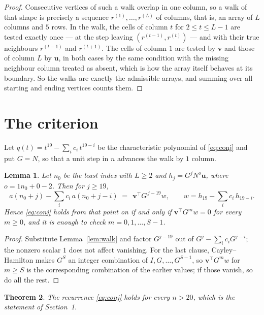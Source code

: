\documentclass[11pt,a4paper]{article}
\theoremstyle{plain}
\newtheorem{theorem}{Theorem}
\newtheorem{lemma}[theorem]{Lemma}
\theoremstyle{definition}
\begin{document}
\begin{proof}
Consecutive vertices of such a walk overlap in one column, so a walk of that shape is
precisely a sequence $r^{(1)},\dots,r^{(L)}$ of columns, that is, an array of $L$ columns
and $5$ rows. In the walk, the cells of column $t$ for $2\le t\le L-1$ are tested
exactly once --- at the step leaving $(r^{(t-1)},r^{(t)})$ --- and with their true
neighbours $r^{(t-1)}$ and $r^{(t+1)}$. The cells of column $1$ are tested by
$\mathbf{v}$ and those of column $L$ by $\mathbf{u}$, in both cases by the same condition
with the missing neighbour column treated as absent, which is how the array itself behaves at
its boundary. So the walks are exactly the admissible arrays, and summing over all starting
and ending vertices counts them.
\end{proof}

\section{The criterion}

Let $q(t)=t^{19}-\sum_i c_i\,t^{19-i}$ be the characteristic polynomial of
\eqref{eq:conj} and put $G=N$, so that a unit step in $n$ advances the walk by
$1$ column.

\begin{lemma}\label{lem:crit}
Let $n_0$ be the least index with $L\ge2$ and $h_j=G^{j}N^{o}\mathbf{u}$, where
$o=1n_0+0-2$. Then for $j\ge19$,
\[
a(n_0+j)-\sum_i c_i\,a(n_0+j-i)\;=\;\,\mathbf{v}^{\!\top}G^{\,j-19}w,
\qquad w=h_{19}-\sum_i c_i\,h_{19-i} .
\]
Hence \eqref{eq:conj} holds from that point on if and only if
$\mathbf{v}^{\!\top}G^{m}w=0$ for every $m\ge0$, and it is enough to check
$m=0,1,\dots,S-1$.
\end{lemma}

\begin{proof}
Substitute Lemma~\ref{lem:walk} and factor $G^{j-19}$ out of
$G^{j}-\sum_ic_iG^{j-i}$; the nonzero scalar $1$ does not affect
vanishing. For the last clause, Cayley--Hamilton makes $G^{S}$ an integer combination of
$I,G,\dots,G^{S-1}$, so $\mathbf{v}^{\!\top}G^{m}w$ for $m\ge S$ is the corresponding
combination of the earlier values; if those vanish, so do all the rest.
\end{proof}

\begin{theorem}
The recurrence \eqref{eq:conj} holds for every $n>20$, which is the statement of
Section~1.
\end{theorem}
\end{document}
